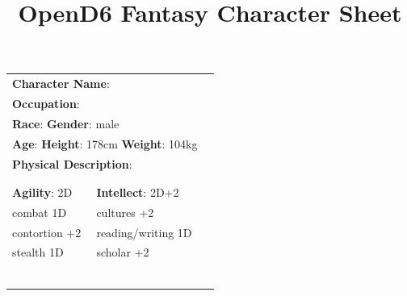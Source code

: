 \documentclass[10pt]{article}
\title{OpenD6 Fantasy Character Sheet}
\begin{document}
\pagestyle{fancy}
\fancyhf{}
\fancyfoot[R]{\thepage}
\renewcommand{\headrulewidth}{0pt}


\cleardoublepage
\begin{table}
\begin{tabular}{m{156pt} m{156pt} m{156pt}}
    \multicolumn{2}{l}{\textbf{Character Name}:  \hrulefill} \\
    \multicolumn{2}{l}{\textbf{Occupation}:  \hrulefill} \\
    \multicolumn{2}{l}{\textbf{Race}:  \hrulefill \hspace{1em} \textbf{Gender}: male \hrulefill} \\
    \multicolumn{2}{l}{\textbf{Age}:  \hrulefill \hspace{1em} \textbf{Height}: 178cm \hrulefill \hspace{1em}  \textbf{Weight}: 104kg \hrulefill } \\
    \multicolumn{2}{l}{\textbf{Physical Description}:  \hrulefill } \\
    \multicolumn{2}{l}{ \hrulefill } \\
 & & \\
\textbf{Agility}: 2D \hrulefill      & \textbf{Intellect}: 2D+2 \hrulefill  &                             \\

combat            1D \hrulefill & cultures          +2 \hrulefill & \\

contortion        +2 \hrulefill & reading/writing   1D \hrulefill & \\

stealth           1D \hrulefill & scholar           +2 \hrulefill & \\

 \hrulefill &  \hrulefill & \\

 \hrulefill &  \hrulefill & \\

 \hrulefill &  \hrulefill & \\

 \hrulefill &  \hrulefill & \\

 \hrulefill &  \hrulefill & \\

 \hrulefill &  \hrulefill & \\


\end{tabular}
\end{table}
\end{document}
